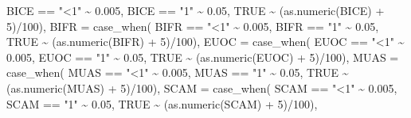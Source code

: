\documentclass[
]{book}
\newenvironment{Shaded}{\begin{snugshade}}{\end{snugshade}}
\newcommand{\AttributeTok}[1]{\textcolor[rgb]{0.77,0.63,0.00}{#1}}
\newcommand{\ConstantTok}[1]{\textcolor[rgb]{0.00,0.00,0.00}{#1}}
\newcommand{\DecValTok}[1]{\textcolor[rgb]{0.00,0.00,0.81}{#1}}
\newcommand{\FloatTok}[1]{\textcolor[rgb]{0.00,0.00,0.81}{#1}}
\newcommand{\FunctionTok}[1]{\textcolor[rgb]{0.00,0.00,0.00}{#1}}
\newcommand{\NormalTok}[1]{#1}
\newcommand{\SpecialCharTok}[1]{\textcolor[rgb]{0.00,0.00,0.00}{#1}}
\newcommand{\StringTok}[1]{\textcolor[rgb]{0.31,0.60,0.02}{#1}}
\begin{document}
\begin{Shaded}
\begin{Highlighting}[]
\NormalTok{          BICE }\SpecialCharTok{==} \StringTok{"\textless{}1"} \SpecialCharTok{\textasciitilde{}} \FloatTok{0.005}\NormalTok{, }
\NormalTok{          BICE }\SpecialCharTok{==} \StringTok{"1"} \SpecialCharTok{\textasciitilde{}} \FloatTok{0.05}\NormalTok{, }
          \ConstantTok{TRUE} \SpecialCharTok{\textasciitilde{}}\NormalTok{ (}\FunctionTok{as.numeric}\NormalTok{(BICE) }\SpecialCharTok{+} \DecValTok{5}\NormalTok{)}\SpecialCharTok{/}\DecValTok{100}\NormalTok{),}
        \AttributeTok{BIFR =} \FunctionTok{case\_when}\NormalTok{(}
\NormalTok{          BIFR }\SpecialCharTok{==} \StringTok{"\textless{}1"} \SpecialCharTok{\textasciitilde{}} \FloatTok{0.005}\NormalTok{, }
\NormalTok{          BIFR }\SpecialCharTok{==} \StringTok{"1"} \SpecialCharTok{\textasciitilde{}} \FloatTok{0.05}\NormalTok{, }
          \ConstantTok{TRUE} \SpecialCharTok{\textasciitilde{}}\NormalTok{ (}\FunctionTok{as.numeric}\NormalTok{(BIFR) }\SpecialCharTok{+} \DecValTok{5}\NormalTok{)}\SpecialCharTok{/}\DecValTok{100}\NormalTok{),}
        \AttributeTok{EUOC =} \FunctionTok{case\_when}\NormalTok{(}
\NormalTok{          EUOC }\SpecialCharTok{==} \StringTok{"\textless{}1"} \SpecialCharTok{\textasciitilde{}} \FloatTok{0.005}\NormalTok{, }
\NormalTok{          EUOC }\SpecialCharTok{==} \StringTok{"1"} \SpecialCharTok{\textasciitilde{}} \FloatTok{0.05}\NormalTok{, }
          \ConstantTok{TRUE} \SpecialCharTok{\textasciitilde{}}\NormalTok{ (}\FunctionTok{as.numeric}\NormalTok{(EUOC) }\SpecialCharTok{+} \DecValTok{5}\NormalTok{)}\SpecialCharTok{/}\DecValTok{100}\NormalTok{),}
        \AttributeTok{MUAS =} \FunctionTok{case\_when}\NormalTok{(}
\NormalTok{          MUAS }\SpecialCharTok{==} \StringTok{"\textless{}1"} \SpecialCharTok{\textasciitilde{}} \FloatTok{0.005}\NormalTok{, }
\NormalTok{          MUAS }\SpecialCharTok{==} \StringTok{"1"} \SpecialCharTok{\textasciitilde{}} \FloatTok{0.05}\NormalTok{, }
          \ConstantTok{TRUE} \SpecialCharTok{\textasciitilde{}}\NormalTok{ (}\FunctionTok{as.numeric}\NormalTok{(MUAS) }\SpecialCharTok{+} \DecValTok{5}\NormalTok{)}\SpecialCharTok{/}\DecValTok{100}\NormalTok{),}
        \AttributeTok{SCAM =} \FunctionTok{case\_when}\NormalTok{(}
\NormalTok{          SCAM }\SpecialCharTok{==} \StringTok{"\textless{}1"} \SpecialCharTok{\textasciitilde{}} \FloatTok{0.005}\NormalTok{, }
\NormalTok{          SCAM }\SpecialCharTok{==} \StringTok{"1"} \SpecialCharTok{\textasciitilde{}} \FloatTok{0.05}\NormalTok{, }
          \ConstantTok{TRUE} \SpecialCharTok{\textasciitilde{}}\NormalTok{ (}\FunctionTok{as.numeric}\NormalTok{(SCAM) }\SpecialCharTok{+} \DecValTok{5}\NormalTok{)}\SpecialCharTok{/}\DecValTok{100}\NormalTok{),}

\end{Highlighting}
\end{Shaded}
\end{document}
